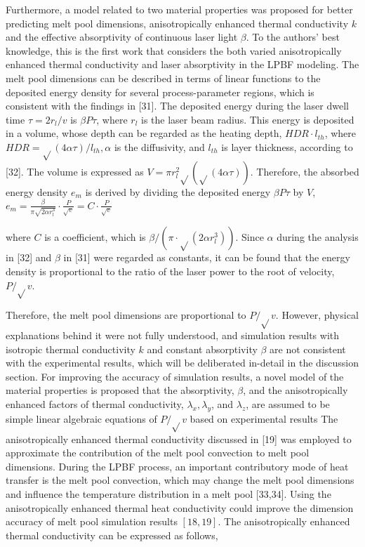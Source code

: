 \documentclass[10pt]{article}
\begin{document}
Furthermore, a model related to two material properties was proposed for better predicting melt pool dimensions, anisotropically enhanced thermal conductivity $k$ and the effective absorptivity of continuous laser light $\beta$. To the authors' best knowledge, this is the first work that considers the both varied anisotropically enhanced thermal conductivity and laser absorptivity in the LPBF modeling. The melt pool dimensions can be described in terms of linear functions to the deposited energy density for several process-parameter regions, which is consistent with the findings in [31]. The deposited energy during the laser dwell time $\tau=2 r_{l} / v$ is $\beta P \tau$, where $r_{l}$ is the laser beam radius. This energy is deposited in a volume, whose depth can be regarded as the heating depth, $H D R \cdot l_{t h}$, where $H D R=\sqrt{ }(4 \alpha \tau) / l_{t h}, \alpha$ is the diffusivity, and $l_{t h}$ is layer thickness, according to [32]. The volume is expressed as $V=\pi r_{l}^{2} \sqrt{ }(\sqrt{ }(4 \alpha \tau))$. Therefore, the absorbed energy density $e_{m}$ is derived by dividing the deposited energy $\beta P \tau$ by $V$, $e_{m}=\frac{\beta}{\pi \sqrt{2 \alpha r_{l}^{3}}} \cdot \frac{P}{\sqrt{v}}=C \cdot \frac{P}{\sqrt{v}}$

where $C$ is a coefficient, which is $\beta /\left(\pi \cdot \sqrt{ }\left(2 \alpha r_{l}^{3}\right)\right)$. Since $\alpha$ during the analysis in [32] and $\beta$ in [31] were regarded as constants, it can be found that the energy density is proportional to the ratio of the laser power to the root of velocity, $P / \sqrt{ } v$.

Therefore, the melt pool dimensions are proportional to $P / \sqrt{ } v$. However, physical explanations behind it were not fully understood, and simulation results with isotropic thermal conductivity $k$ and constant absorptivity $\beta$ are not consistent with the experimental results, which will be deliberated in-detail in the discussion section. For improving the accuracy of simulation results, a novel model of the material properties is proposed that the absorptivity, $\beta$, and the anisotropically enhanced factors of thermal conductivity, $\lambda_{x}, \lambda_{y}$, and $\lambda_{z}$, are assumed to be simple linear algebraic equations of $P / \sqrt{ } v$ based on experimental results The anisotropically enhanced thermal conductivity discussed in [19] was employed to approximate the contribution of the melt pool convection to melt pool dimensions. During the LPBF process, an important contributory mode of heat transfer is the melt pool convection, which may change the melt pool dimensions and influence the temperature distribution in a melt pool [33,34]. Using the anisotropically enhanced thermal heat conductivity could improve the dimension accuracy of melt pool simulation results $[18,19]$. The anisotropically enhanced thermal conductivity can be expressed as follows,
\end{document}
